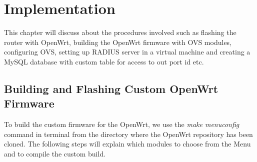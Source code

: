 \chapter{Implementation} \label{ch:implementation}
This chapter will discuss about the procedures involved such as flashing the router with OpenWrt, building the OpenWrt firmware with OVS modules, configuring OVS, setting up RADIUS server in a virtual machine and creating a MySQL database with custom table for access to out port id etc.
\section{Building and Flashing Custom OpenWrt Firmware}
To build the custom firmware for the OpenWrt, we use the \textit{make menuconfig} command in terminal from the directory where the OpenWrt repository has been cloned. The following steps will explain which modules to choose from the Menu and to compile the custom build.
